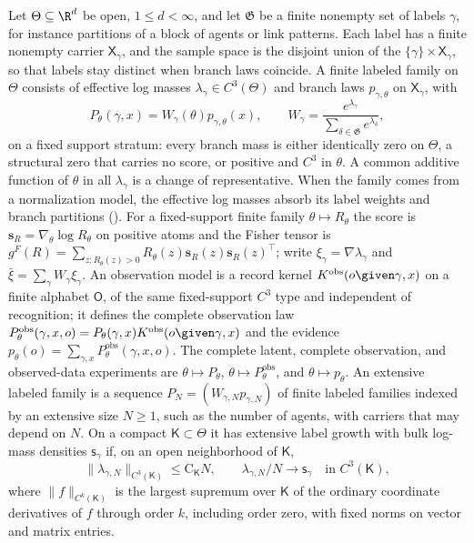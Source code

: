 \label{def:rg-thermo-finite-score}
\label{hyp:rg-thermo-finite-support}
\label{eq:rg-thermo-label-family}
\label{eq:rg-thermo-finite-fisher-definition}
Let $\Theta\subseteq\R^d$ be open, $1\leq d<\infty$, and let $\mathfrak G$ be a finite nonempty
set of labels $\gamma$, for instance partitions of a block of agents or link patterns. Each label
has a finite nonempty carrier $\mathsf X_\gamma$, and the sample space is the disjoint union of the
$\{\gamma\}\times\mathsf X_\gamma$, so that labels stay distinct when branch laws coincide. A finite
labeled family on $\Theta$ consists of effective log masses $\lambda_\gamma\in C^3(\Theta)$ and
branch laws $p_{\gamma,\theta}$ on $\mathsf X_\gamma$, with
\begin{equation}
P_\theta(\gamma,x)=W_\gamma(\theta)p_{\gamma,\theta}(x),
\qquad
W_\gamma=\frac{e^{\lambda_\gamma}}{\sum_{\delta\in\mathfrak G}e^{\lambda_\delta}},
\label{eq:rg-thermo-finite-log-masses}
\end{equation}
on a fixed support stratum: every branch mass is either identically zero on $\Theta$, a structural
zero that carries no score, or positive and $C^3$ in $\theta$. A common additive function of
$\theta$ in all $\lambda_\gamma$ is a change of representative. When the family comes from a
normalization model, the effective log masses absorb its label weights and branch partitions
(). For a fixed-support finite family $\theta\mapsto R_\theta$ the
score is $\mathbf s_R=\nabla_\theta\log R_\theta$ on positive atoms and the Fisher tensor is
$g^F(R)=\sum_{z:R_\theta(z)>0}R_\theta(z)\mathbf s_R(z)\mathbf s_R(z)^\top$; write
$\xi_\gamma=\nabla\lambda_\gamma$ and $\bar\xi=\sum_\gamma W_\gamma\xi_\gamma$. An observation model
is a record kernel $K^{\mathrm{obs}}(o\given\gamma,x)$ on a finite alphabet $\mathsf O$, of the same
fixed-support $C^3$ type and independent of recognition; it defines the complete observation law
$P^{\mathrm{obs}}_\theta(\gamma,x,o)=P_\theta(\gamma,x)K^{\mathrm{obs}}(o\given\gamma,x)$ and the
evidence $p_\theta(o)=\sum_{\gamma,x}P^{\mathrm{obs}}_\theta(\gamma,x,o)$. The complete latent,
complete observation, and observed-data experiments are $\theta\mapsto P_\theta$,
$\theta\mapsto P^{\mathrm{obs}}_\theta$, and $\theta\mapsto p_\theta$. An extensive labeled family
is a sequence $P_N=(W_{\gamma,N}p_{\gamma,N})$ of finite labeled families indexed by an extensive
size $N\geq1$, such as the number of agents, with carriers that may depend on $N$. On a compact
$\mathsf K\subset\Theta$ it has extensive label growth with bulk log-mass densities
$\mathsf s_\gamma$ if, on an open neighborhood of $\mathsf K$,
\begin{equation}
\|\lambda_{\gamma,N}\|_{C^3(\mathsf K)}\leq\mathrm C_{\mathsf K}N,
\qquad
\lambda_{\gamma,N}/N\longrightarrow\mathsf s_\gamma\quad\text{in }C^3(\mathsf K),
\label{eq:rg-thermo-label-effective-growth}
\end{equation}
where $\|f\|_{C^k(\mathsf K)}$ is the largest supremum over $\mathsf K$ of the ordinary coordinate
derivatives of $f$ through order $k$, including order zero, with fixed norms on vector and matrix
entries.

